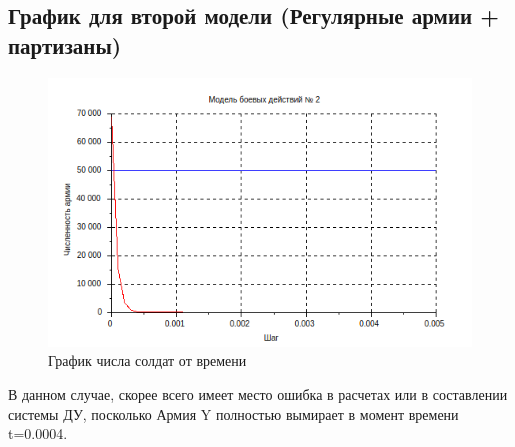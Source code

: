 \documentclass[unicode, 12pt, a4paper,oneside]{article}
\begin{document}
    \subsection{График для второй модели (Регулярные армии + партизаны)}
    \begin{figure}[H]
        \centering
        \includegraphics{lab02/lab2-graph.png}
        \caption{График числа солдат от времени}
        \label{fig:model2l}
    \end{figure}
    В данном случае, скорее всего имеет место ошибка в расчетах или в составлении системы ДУ, посколько Армия Y полностью вымирает в момент времени t=0.0004.
    
    
\end{document}
